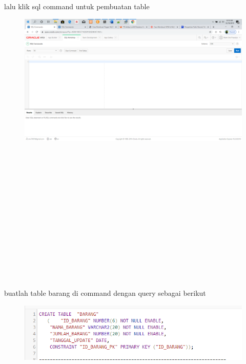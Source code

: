 \documentclass{article}
\begin{document}
\\
\\
\\
\\
\
\
\
\
\par lalu klik sql command untuk pembuatan table
\begin{figure}[h]
\includegraphics[scale=0.3]{img/3.PNG}
\end{figure}
\\
\\
\\
\\
\\
\\
\\
\\
\\
\\
\\
\\
\\
\par buatlah table barang di command dengan query sebagai berikut
\begin{figure}[h]
\includegraphics[scale=0.3]{img/4.PNG}
\end{figure}
\\
\\
\\
\\
\\
\\
\\
\end{document}
